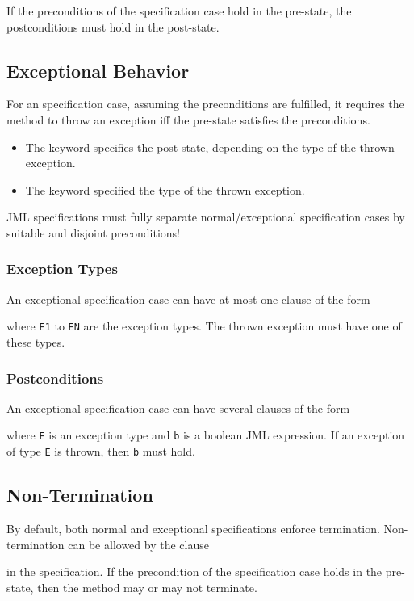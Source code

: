 				If the preconditions of the specification case hold in the pre-state, the postconditions must hold in the post-state.

		\subsection{Exceptional Behavior}
			For an  specification case, assuming the preconditions are fulfilled, it requires the method to throw an exception iff the pre-state satisfies the preconditions.
			\begin{itemize}
				\item The keyword  specifies the post-state, depending on the type of the thrown exception.
				\item The keyword  specified the type of the thrown exception.
			\end{itemize}
			JML specifications must fully separate normal/exceptional specification cases by suitable and disjoint preconditions!

			\subsubsection{Exception Types}
				An exceptional specification case can have at most one clause of the form
				\begin{center}
				\end{center}
				where \texttt{E1} to \texttt{EN} are the exception types. The thrown exception must have one of these types.

			\subsubsection{Postconditions}
				\label{sec:postcond2}

				An exceptional specification case can have several clauses of the form
				\begin{center}
				\end{center}
				where \texttt{E} is an exception type and \texttt{b} is a boolean JML expression. If an exception of type \texttt{E} is thrown, then \texttt{b} must hold.

		\subsection{Non-Termination}
			By default, both normal and exceptional specifications enforce termination. Non-termination can be allowed by the clause
			\begin{center}
			\end{center}
			in the specification. If the precondition of the specification case holds in the pre-state, then the method may or may not terminate.

